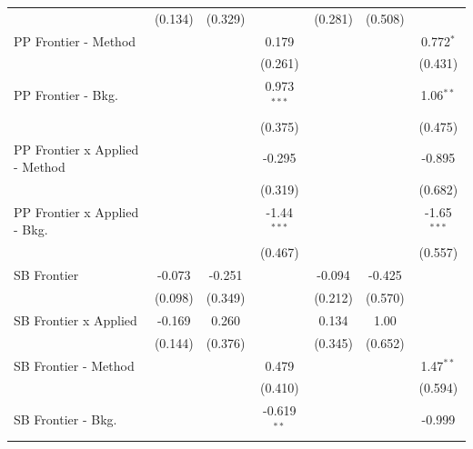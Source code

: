 \begin{tabular}{lcccccc}
                                  & (0.134)       & (0.329)       &               & (0.281)        & (0.508)       &   \\   
   PP Frontier - Method           &               &               & 0.179         &                &               & 0.772$^{*}$\\   
                                  &               &               & (0.261)       &                &               & (0.431)\\   
   PP Frontier - Bkg.             &               &               & 0.973$^{***}$ &                &               & 1.06$^{**}$\\   
                                  &               &               & (0.375)       &                &               & (0.475)\\   
   PP Frontier x Applied - Method &               &               & -0.295        &                &               & -0.895\\   
                                  &               &               & (0.319)       &                &               & (0.682)\\   
   PP Frontier x Applied - Bkg.   &               &               & -1.44$^{***}$ &                &               & -1.65$^{***}$\\   
                                  &               &               & (0.467)       &                &               & (0.557)\\   
   SB Frontier                    & -0.073        & -0.251        &               & -0.094         & -0.425        &   \\   
                                  & (0.098)       & (0.349)       &               & (0.212)        & (0.570)       &   \\   
   SB Frontier x Applied          & -0.169        & 0.260         &               & 0.134          & 1.00          &   \\   
                                  & (0.144)       & (0.376)       &               & (0.345)        & (0.652)       &   \\   
   SB Frontier - Method           &               &               & 0.479         &                &               & 1.47$^{**}$\\   
                                  &               &               & (0.410)       &                &               & (0.594)\\   
   SB Frontier - Bkg.             &               &               & -0.619$^{**}$ &                &               & -0.999\\   

\end{tabular}
